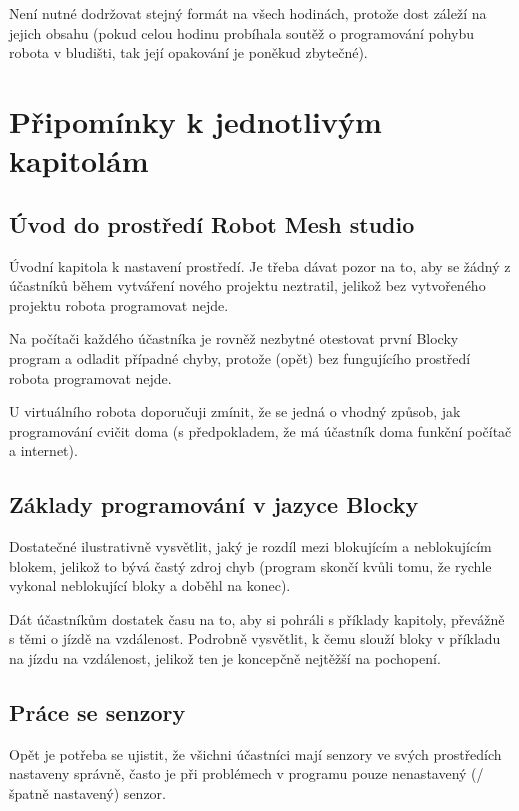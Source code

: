Není nutné dodržovat stejný formát na všech hodinách, protože dost záleží na jejich obsahu (pokud celou hodinu probíhala soutěž o programování pohybu robota v bludišti, tak její opakování je poněkud zbytečné).

\newpage

\section{Připomínky k jednotlivým kapitolám}

\setcounter{secnumdepth}{3}

\subsection{Úvod do prostředí Robot Mesh studio}
Úvodní kapitola k nastavení prostředí. Je třeba dávat pozor na to, aby se žádný z účastníků během vytváření nového projektu neztratil, jelikož bez vytvořeného projektu robota programovat nejde.

Na počítači každého účastníka je rovněž nezbytné otestovat první Blocky program a odladit případné chyby, protože (opět) bez fungujícího prostředí robota programovat nejde.

U virtuálního robota doporučuji zmínit, že se jedná o vhodný způsob, jak programování cvičit doma (s předpokladem, že má účastník doma funkční počítač a internet).

\subsection{Základy programování v jazyce Blocky}
Dostatečné ilustrativně vysvětlit, jaký je rozdíl mezi blokujícím a neblokujícím blokem, jelikož to bývá častý zdroj chyb (program skončí kvůli tomu, že rychle vykonal neblokující bloky a doběhl na konec).

Dát účastníkům dostatek času na to, aby si pohráli s příklady kapitoly, převážně s těmi o jízdě na vzdálenost. Podrobně vysvětlit, k čemu slouží bloky v příkladu na jízdu na vzdálenost, jelikož ten je koncepčně nejtěžší na pochopení.

\subsection{Práce se senzory}
Opět je potřeba se ujistit, že všichni účastníci mají senzory ve svých prostředích nastaveny správně, často je při problémech v programu pouze nenastavený (/špatně nastavený) senzor.


